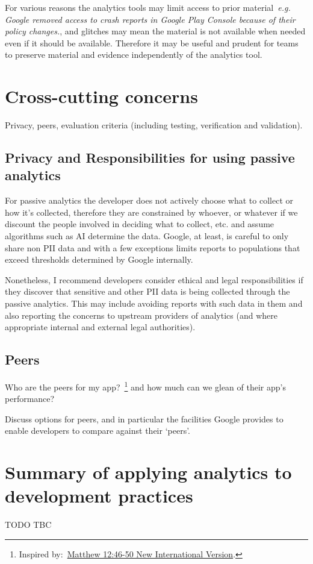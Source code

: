 For various reasons the analytics tools may limit access to prior material~\emph{e.g. Google removed access to crash reports in Google Play Console because of their policy changes.}, and glitches may mean the material is not available when needed even if it should be available. Therefore it may be useful and prudent for teams to preserve material and evidence independently of the analytics tool. 

\section{Cross-cutting concerns}
Privacy, peers, evaluation criteria (including testing, verification and validation).

\subsection{Privacy and Responsibilities for using passive analytics}
For passive analytics the developer does not actively choose what to collect or how it's collected, therefore they are constrained by whoever, or whatever if we discount the people involved in deciding what to collect, etc. and assume algorithms such as AI determine the data. Google, at least, is careful to only share non PII %
data and with a few exceptions limits reports to populations that exceed thresholds determined by Google internally. %

Nonetheless, I recommend developers consider ethical and legal responsibilities if they discover that sensitive and other PII data is being collected through the passive analytics. This may include avoiding reports with such data in them and also reporting the concerns to upstream providers of analytics (and where appropriate internal and external legal authorities).

\subsection{Peers}
Who are the peers for my app?~\footnote{Inspired by:~\href{https://www.biblegateway.com/passage/?search=Matthew\%2012:46-50&version=NIV}{Matthew 12:46-50 New International Version}.} and how much can we glean of their app's performance?

Discuss options for peers, and in particular the facilities Google provides to enable developers to compare against their `peers'.



\section{Summary of applying analytics to development practices}
TODO TBC
